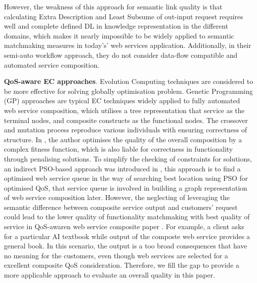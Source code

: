 \documentclass{llncs}
\begin{document}
However, the weakness of this approach for semantic link quality is that calculating Extra Description and Least Subsume of out-input request requires well and complete defined DL in knowledge representation in the different domains, which makes it nearly impossible to be widely applied to semantic matchmaking measures in today's' web services application. Additionally, in their semi-auto workflow approach, they do not consider data-flow compatible and automated service composition.

\textbf{QoS-aware EC approaches}.
Evolution Computing techniques are considered to be more effective for solving globally optimisation problem. Genetic Programming (GP) approaches \cite{da2015graphevol,da2016particle} are typical EC techniques widely applied to fully automated web service composition, which utilises a tree representation that service as the terminal nodes, and composite constructs as the functional nodes. The crossover and mutation process reproduce various individuals with ensuring correctness of structure. In \cite{yu2013adaptive}, the author optimises the quality of the overall composition by a complex fitness function, which is also liable for correctness in functionality through penalising solutions. To simplify the checking of constraints for solutions, an indirect PSO-based approach was introduced in \cite{da2016particle}, this approach is to find a optimised web service queue in the way of searching best location using PSO for optimised QoS, that service queue is involved in building a graph representation of web service composition later. However, the neglecting of leveraging the semantic difference between composite service output and customers' request could lead to the lower quality of functionality matchmaking with best quality of service in QoS-awaren web service composite paper \cite{feng2013dynamic,huang2009effective,ma2015hybrid,da2014graph}. For example, a client asks for a particular AI textbook while output of the composte web service provides a general book. In this scenario, the output is a too broad consequences that have no meaning for the customers, even though web services are selected for a excellent composite QoS consideration. Therefore, we fill the gap to provide a more applicable approach to evaluate an overall quality in this paper.
\end{document}
